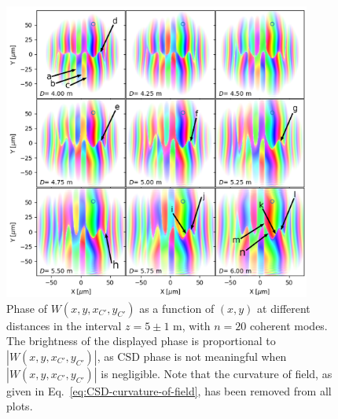 \documentclass[%
 reprint,
 amsmath,amssymb,
 aps,
]{revtex4-1}
\begin{document}
\begin{figure}
\includegraphics[width=0.9\textwidth]{Figures/vx_id16a_C5_propagated_neighbour_mode0019_witharrows2.png}
\caption{Phase of $W(x,y,x_{C'},y_{C'})$ as a function of $(x,y)$ at different distances in the interval $z=5\pm 1$ m, with $n=20$ coherent modes. The brightness of the displayed phase is proportional to $|W(x,y,x_{C'},y_{C'})|$, as CSD phase is not meaningful when $|W(x,y,x_{C'},y_{C'})|$ is negligible. Note that the curvature of field, as given in Eq.~\ref{eq:CSD-curvature-of-field}, has been removed from all plots.}
\label{neighbour}%
\end{figure}
\end{document}
